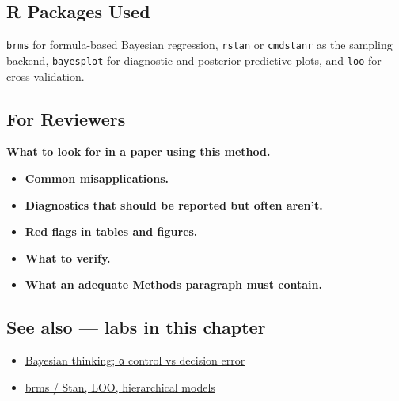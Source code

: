 \documentclass[
]{article}
\providecommand{\tightlist}{%
  \setlength{\itemsep}{0pt}\setlength{\parskip}{0pt}}
\begin{document}
\subsection{R Packages Used}\label{r-packages-used}

\texttt{brms} for formula-based Bayesian regression, \texttt{rstan} or
\texttt{cmdstanr} as the sampling backend, \texttt{bayesplot} for
diagnostic and posterior predictive plots, and \texttt{loo} for
cross-validation.

\subsection{For Reviewers}\label{for-reviewers}

\textbf{What to look for in a paper using this method.}

\begin{itemize}
\tightlist
\item
  \textbf{Common misapplications.}
\item
  \textbf{Diagnostics that should be reported but often aren't.}
\item
  \textbf{Red flags in tables and figures.}
\item
  \textbf{What to verify.}
\item
  \textbf{What an adequate Methods paragraph must contain.}
\end{itemize}

\subsection{See also --- labs in this
chapter}\label{see-also-labs-in-this-chapter}

\begin{itemize}
\tightlist
\item
  \href{labs/lab-bayesian-thinking-control-vs-decision-error.Rmd}{Bayesian
  thinking; α control vs decision error}
\item
  \href{labs/lab-brms-stan-loo-hierarchical-models.Rmd}{brms / Stan,
  LOO, hierarchical models}
\end{itemize}
\end{document}
